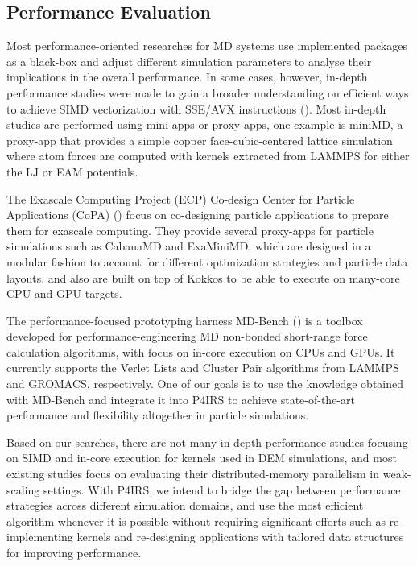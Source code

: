\documentclass[Afour,sageh,times]{sagej}
\begin{document}
\subsection{Performance Evaluation}
\label{sec:perfeval}

Most performance-oriented researches for \ac{MD} systems use implemented packages as a black-box and adjust different simulation parameters to analyse their implications in the overall performance.
In some cases, however, in-depth performance studies were made to gain a broader understanding on efficient ways to achieve SIMD vectorization with SSE/AVX instructions (\cite{mdsimd}).
Most in-depth studies are performed using mini-apps or proxy-apps, one example is miniMD, a proxy-app that provides a simple copper face-cubic-centered lattice simulation where atom forces are computed with kernels extracted from LAMMPS for either the \ac{LJ} or \ac{EAM} potentials.

The Exascale Computing Project (ECP) Co-design Center for Particle Applications (CoPA) (\cite{ecpcopa}) focus on co-designing particle applications to prepare them for exascale computing.
They provide several proxy-apps for particle simulations such as CabanaMD and ExaMiniMD, which are designed in a modular fashion to account for different optimization strategies and particle data layouts, and also are built on top of Kokkos to be able to execute on many-core CPU and GPU targets.

The performance-focused prototyping harness MD-Bench (\cite{mdbench1,mdbench2}) is a toolbox developed for performance-engineering \ac{MD} non-bonded short-range force calculation algorithms, with focus on in-core execution on CPUs and GPUs.
It currently supports the Verlet Lists and Cluster Pair algorithms from LAMMPS and GROMACS, respectively.
One of our goals is to use the knowledge obtained with MD-Bench and integrate it into P4IRS to achieve state-of-the-art performance and flexibility altogether in particle simulations.

Based on our searches, there are not many in-depth performance studies focusing on SIMD and in-core execution for kernels used in DEM simulations, and most existing studies focus on evaluating their distributed-memory parallelism in weak-scaling settings.
With P4IRS, we intend to bridge the gap between performance strategies across different simulation domains, and use the most efficient algorithm whenever it is possible without requiring significant efforts such as re-implementing kernels and re-designing applications with tailored data structures for improving performance.
\end{document}
